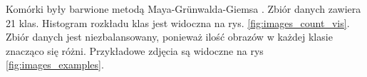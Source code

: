 Komórki były barwione metodą Maya-Grünwalda-Giemsa \cite{histology}. Zbiór danych zawiera 21 klas.
Histogram rozkładu klas jest widoczna na rys. \ref{fig:images_count_vis}.
Zbiór danych jest niezbalansowany, ponieważ ilość obrazów w każdej klasie znacząco się różni.
Przykładowe zdjęcia są widoczne na rys \ref{fig:images_examples}.


%
%
%
%
%
%
